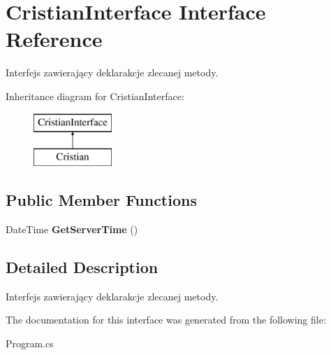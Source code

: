 \hypertarget{interface_cristian_interface}{\section{Cristian\+Interface Interface Reference}
\label{interface_cristian_interface}
}


Interfejs zawierający deklarakcje zlecanej metody.  


Inheritance diagram for Cristian\+Interface\+:\begin{figure}[H]
\begin{center}
\leavevmode
\includegraphics[height=2.000000cm]{interface_cristian_interface}
\end{center}
\end{figure}
\subsection*{Public Member Functions}
\begin{DoxyCompactItemize}
\item 
\hypertarget{interface_cristian_interface_a85bc7efa032f0cedfad7476ff9a644f3}{Date\+Time {\bfseries Get\+Server\+Time} ()}\label{interface_cristian_interface_a85bc7efa032f0cedfad7476ff9a644f3}

\end{DoxyCompactItemize}


\subsection{Detailed Description}
Interfejs zawierający deklarakcje zlecanej metody. 

The documentation for this interface was generated from the following file\+:\begin{DoxyCompactItemize}
\item 
Program.\+cs\end{DoxyCompactItemize}
